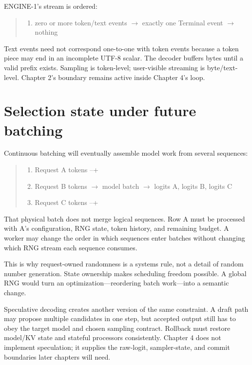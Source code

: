 ENGINE-1's stream is ordered:

\begin{quote}
\begin{enumerate}
\item zero or more token/text events  \(\longrightarrow\)  exactly one Terminal event  \(\longrightarrow\)  nothing
\end{enumerate}
\end{quote}

Text events need not correspond one-to-one with token events because a
token piece may end in an incomplete UTF-8 scalar. The decoder buffers
bytes until a valid prefix exists. Sampling is token-level; user-visible
streaming is byte/text-level. Chapter 2's boundary remains active inside
Chapter 4's loop.

\section{Selection state under future
batching}\label{selection-state-under-future-batching}

Continuous batching will eventually assemble model work from several
sequences:

\begin{quote}
\begin{enumerate}
\item Request A tokens --+
\item Request B tokens  \(\longrightarrow\)  model batch  \(\longrightarrow\)  logits A, logits B, logits C
\item Request C tokens --+
\end{enumerate}
\end{quote}

That physical batch does not merge logical sequences. Row A must be
processed with A's configuration, RNG state, token history, and
remaining budget. A worker may change the order in which sequences enter
batches without changing which RNG stream each sequence consumes.

This is why request-owned randomness is a systems rule, not a detail of
random number generation. State ownership makes scheduling freedom
possible. A global RNG would turn an optimization---reordering batch
work---into a semantic change.

Speculative decoding creates another version of the same constraint. A
draft path may propose multiple candidates in one step, but accepted
output still has to obey the target model and chosen sampling contract.
Rollback must restore model/KV state and stateful processors
consistently. Chapter 4 does not implement speculation; it supplies the
raw-logit, sampler-state, and commit boundaries later chapters will
need.


